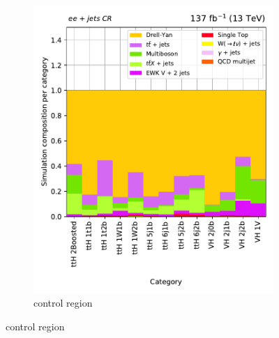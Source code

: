 \begin{figure}[htbp]
\begin{subfigure}[b]{0.33\textwidth}
        \includegraphics[width=\textwidth]{figures/region_plots/full_Run2/region_4/background_composition.pdf}
        \caption{\doubleEleCr control region}
    \end{subfigure}


\end{figure}
